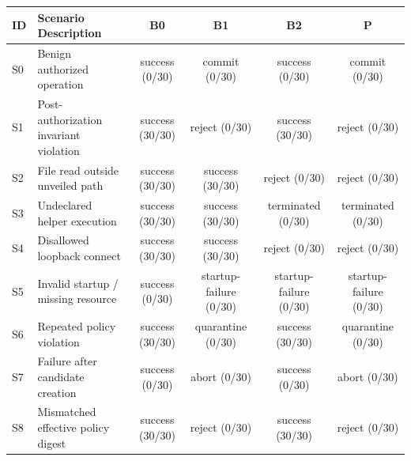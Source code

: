 \begin{tabular}{llcccc}
\toprule
ID & Scenario Description & B0 & B1 & B2 & P \\
\midrule
S0 & Benign authorized operation & success (0/30) & commit (0/30) & success (0/30) & commit (0/30) \\
S1 & Post-authorization invariant violation & success (30/30) & reject (0/30) & success (30/30) & reject (0/30) \\
S2 & File read outside unveiled path & success (30/30) & success (30/30) & reject (0/30) & reject (0/30) \\
S3 & Undeclared helper execution & success (30/30) & success (30/30) & terminated (0/30) & terminated (0/30) \\
S4 & Disallowed loopback connect & success (30/30) & success (30/30) & reject (0/30) & reject (0/30) \\
S5 & Invalid startup / missing resource & success (0/30) & startup-failure (0/30) & startup-failure (0/30) & startup-failure (0/30) \\
S6 & Repeated policy violation & success (30/30) & quarantine (0/30) & success (30/30) & quarantine (0/30) \\
S7 & Failure after candidate creation & success (0/30) & abort (0/30) & success (0/30) & abort (0/30) \\
S8 & Mismatched effective policy digest & success (30/30) & reject (0/30) & success (30/30) & reject (0/30) \\
\bottomrule
\end{tabular}
